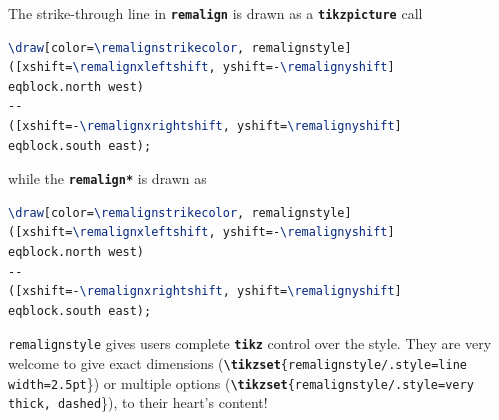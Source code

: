 \documentclass[a4paper]{ltxdoc}
\newcommand{\writecommand}[1]{\texttt{\textbf{{\textbackslash#1}}}}
\newcommand{\writeenv}[1]{\texttt{\textbf{{#1}}}}
\begin{document}
The strike-through line in \writeenv{remalign} is drawn as a \writeenv{tikzpicture} call

\begin{lstlisting}[language=TeX]
\draw[color=\remalignstrikecolor, remalignstyle] 
([xshift=\remalignxleftshift, yshift=-\remalignyshift]
eqblock.north west) 
-- 
([xshift=-\remalignxrightshift, yshift=\remalignyshift]
eqblock.south east);
\end{lstlisting}

while the \writeenv{remalign*} is drawn as

\begin{lstlisting}[language=TeX]
\draw[color=\remalignstrikecolor, remalignstyle] 
([xshift=\remalignxleftshift, yshift=-\remalignyshift]
eqblock.north west) 
-- 
([xshift=-\remalignxrightshift, yshift=\remalignyshift]
eqblock.south east);
\end{lstlisting}

\texttt{remalignstyle} gives users complete \writeenv{tikz} control over the style. They are very welcome to give exact dimensions (\texttt{\writecommand{tikzset}\{remalignstyle/.style={line width=2.5pt}}\}) or multiple options (\texttt{\writecommand{tikzset}\{remalignstyle/.style={very thick, dashed}}\}), to their heart's content!



\end{document}

